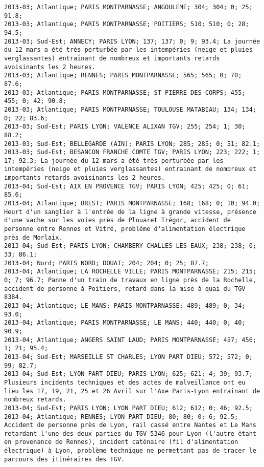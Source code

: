 \documentclass{article}
\begin{document}
\begin{Verbatim}[commandchars=\\\{\}]
2013-03; Atlantique; PARIS MONTPARNASSE; ANGOULEME; 304; 304; 0; 25; 91.8; 
2013-03; Atlantique; PARIS MONTPARNASSE; POITIERS; 510; 510; 0; 28; 94.5; 
2013-03; Sud-Est; ANNECY; PARIS LYON; 137; 137; 0; 9; 93.4; La journée du 12 mars a été très perturbée par les intempéries (neige et pluies verglassantes) entrainant de nombreux et importants retards avoisinants les 2 heures.
2013-03; Atlantique; RENNES; PARIS MONTPARNASSE; 565; 565; 0; 70; 87.6; 
2013-03; Atlantique; PARIS MONTPARNASSE; ST PIERRE DES CORPS; 455; 455; 0; 42; 90.8; 
2013-03; Atlantique; PARIS MONTPARNASSE; TOULOUSE MATABIAU; 134; 134; 0; 22; 83.6; 
2013-03; Sud-Est; PARIS LYON; VALENCE ALIXAN TGV; 255; 254; 1; 30; 88.2; 
2013-03; Sud-Est; BELLEGARDE (AIN); PARIS LYON; 285; 285; 0; 51; 82.1; 
2013-03; Sud-Est; BESANCON FRANCHE COMTE TGV; PARIS LYON; 223; 222; 1; 17; 92.3; La journée du 12 mars a été très perturbée par les intempéries (neige et pluies verglassantes) entrainant de nombreux et importants retards avoisinants les 2 heures.
2013-04; Sud-Est; AIX EN PROVENCE TGV; PARIS LYON; 425; 425; 0; 61; 85.6; 
2013-04; Atlantique; BREST; PARIS MONTPARNASSE; 168; 168; 0; 10; 94.0; Heurt d'un sanglier à l'entrée de la ligne à grande vitesse, présence d'une vache sur les voies près de Plouaret Trégor, accident de personne entre Rennes et Vitré, problème d'alimentation électrique près de Morlaix.
2013-04; Sud-Est; PARIS LYON; CHAMBERY CHALLES LES EAUX; 238; 238; 0; 33; 86.1; 
2013-04; Nord; PARIS NORD; DOUAI; 204; 204; 0; 25; 87.7; 
2013-04; Atlantique; LA ROCHELLE VILLE; PARIS MONTPARNASSE; 215; 215; 0; 7; 96.7; Panne d'un train de travaux en ligne près de la Rochelle, accident de personne à Poitiers, retard dans la mise à quai du TGV 8384.
2013-04; Atlantique; LE MANS; PARIS MONTPARNASSE; 489; 489; 0; 34; 93.0; 
2013-04; Atlantique; PARIS MONTPARNASSE; LE MANS; 440; 440; 0; 40; 90.9; 
2013-04; Atlantique; ANGERS SAINT LAUD; PARIS MONTPARNASSE; 457; 456; 1; 21; 95.4; 
2013-04; Sud-Est; MARSEILLE ST CHARLES; LYON PART DIEU; 572; 572; 0; 99; 82.7; 
2013-04; Sud-Est; LYON PART DIEU; PARIS LYON; 625; 621; 4; 39; 93.7; Plusieurs incidents techniques et des actes de malveillance ont eu lieu les 17, 19, 21, 25 et 26 Avril sur l'Axe Paris-Lyon entrainant de nombreux retards.
2013-04; Sud-Est; PARIS LYON; LYON PART DIEU; 612; 612; 0; 46; 92.5; 
2013-04; Atlantique; RENNES; LYON PART DIEU; 80; 80; 0; 6; 92.5; Accident de personne près de Lyon, rail cassé entre Nantes et Le Mans retardant l'une des deux parties du TGV 5346 pour Lyon (l'autre étant en provenance de Rennes), incident caténaire (fil d'alimentation électrique) à Lyon, problème technique ne permettant pas de tracer le parcours des itinéraires des TGV.

\end{Verbatim}
\end{document}
